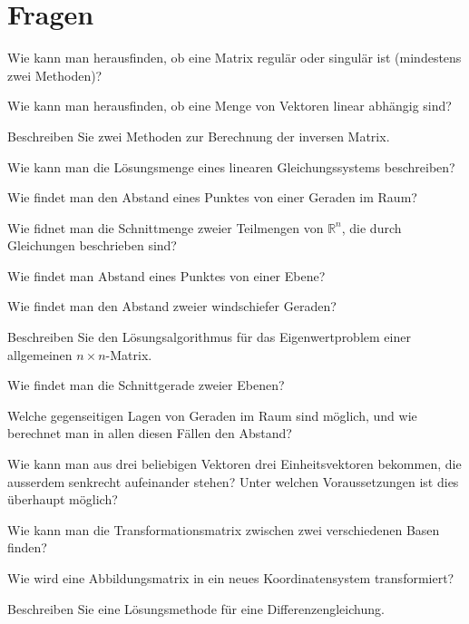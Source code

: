 \documentclass[a4paper,12pt,twocolumn]{article}
\begin{document}
\section{Fragen}
\begin{compactenum}
\item Wie kann man herausfinden, ob eine Matrix regulär oder singulär ist (mindestens zwei Methoden)?
\item Wie kann man herausfinden, ob eine Menge von Vektoren linear
abhängig sind?
\item Beschreiben Sie zwei Methoden zur Berechnung der inversen Matrix.
\item Wie kann man die Lösungsmenge eines linearen Gleichungssystems
beschreiben?
\item Wie findet man den Abstand eines Punktes von einer Geraden im Raum?
\item Wie fidnet man die Schnittmenge zweier Teilmengen von $\mathbb R^n$, die
durch Gleichungen beschrieben sind?
\item Wie findet man Abstand eines Punktes von einer Ebene?
\item Wie findet man den Abstand zweier windschiefer Geraden?
\item Beschreiben Sie den Lösungsalgorithmus für das Eigenwertproblem
einer allgemeinen $n\times n$-Matrix.
\item Wie findet man die Schnittgerade zweier Ebenen?
\item Welche gegenseitigen Lagen von Geraden im Raum sind möglich, und
wie berechnet man in allen diesen Fällen den Abstand?
\item Wie kann man aus drei beliebigen Vektoren drei Einheitsvektoren
bekommen, die ausserdem senkrecht aufeinander stehen?
Unter welchen Voraussetzungen ist dies überhaupt möglich?
\item Wie kann man die Transformationsmatrix zwischen zwei verschiedenen
Basen finden?
\item Wie wird eine Abbildungsmatrix in ein neues Koordinatensystem
transformiert?
\item Beschreiben Sie eine Lösungsmethode für eine Differenzengleichung.
\end{compactenum}
\end{document}
